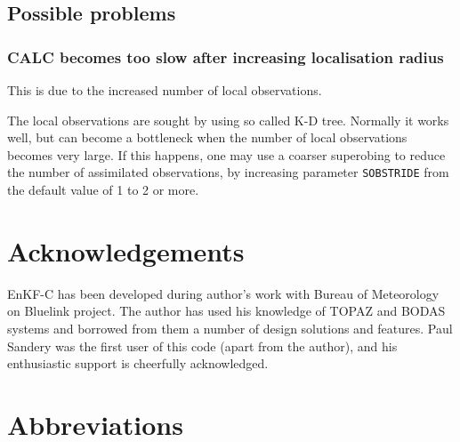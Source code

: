 \documentclass[11pt]{report}
\begin{document}
\section{Possible problems}

\subsection{CALC becomes too slow after increasing localisation radius}

This is due to the increased number of local observations.

The local observations are sought by using so called K-D tree.
Normally it works well, but can become a bottleneck when the number of local observations becomes very large.
If this happens, one may use a coarser superobing to reduce the number of assimilated observations, by increasing parameter \verb|SOBSTRIDE| from the default value of 1 to 2 or more.

\chapter*{Acknowledgements}

EnKF-C has been developed during author's work with Bureau of Meteorology on Bluelink project.
The author has used his knowledge of TOPAZ \citep{sak12b} and BODAS \citep{oke08b} systems and borrowed from them a number of design solutions and features.
Paul Sandery was the first user of this code (apart from the author), and his enthusiastic support is cheerfully acknowledged.

\clearpage

\nocite{eve94a}
\nocite{eve03a}
\nocite{hun04a}
\nocite{hun07a}
\nocite{sak08a}
\nocite{sak10a}
\nocite{sak11a}




\clearpage

\chapter*{Abbreviations}
\end{document}
